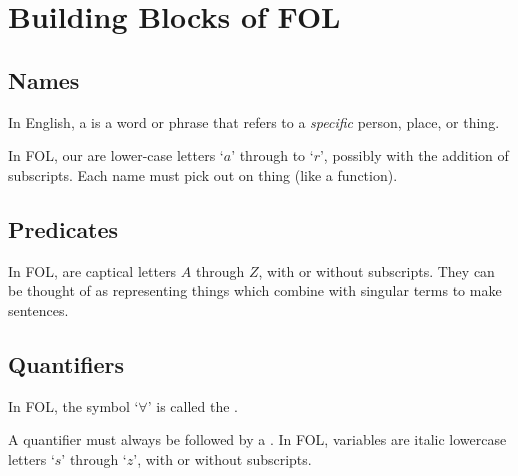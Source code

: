%
%
%
\chapter{Building Blocks of FOL}
\label{Block} %

\section{ Names}

\begin{definition}
    In English, a  is a word or phrase that refers to a \emph{specific} person, place, or thing.
\end{definition}

\begin{definition}
    In FOL, our  are lower-case letters `$a$' through to `$r$', possibly with the addition of subscripts. Each name must pick out  on thing (like a function).
\end{definition}

\section{ Predicates}

\begin{definition}
    In FOL,  are captical letters $A$ through $Z$, with or without subscripts. They can be thought of as representing things which combine with singular terms to make sentences.
\end{definition}


\section{ Quantifiers}

\begin{definition}
    In FOL, the symbol `$\forall$' is called the .
\end{definition}

\begin{remark}
    A quantifier must always be followed by a . In FOL, variables are italic lowercase letters `$s$' through `$z$', with or without subscripts.
\end{remark}


